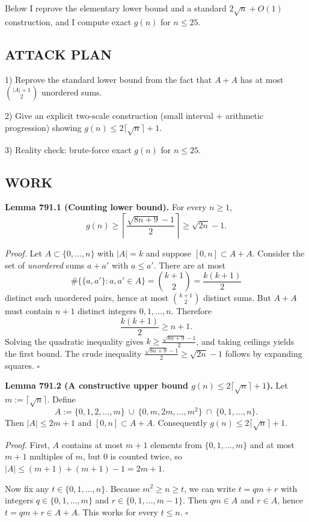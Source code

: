 Below I reprove the elementary lower bound and a standard $2\sqrt n+O(1)$ construction, and I compute exact $g(n)$ for $n\le 25$.

\subsection*{ATTACK PLAN}
1) Reprove the standard lower bound from the fact that $A+A$ has at most $\binom{|A|+1}{2}$ unordered sums.

2) Give an explicit two-scale construction (small interval + arithmetic progression) showing $g(n)\le 2\lceil\sqrt n\rceil+1$.

3) Reality check: brute-force exact $g(n)$ for $n\le 25$.

\subsection*{WORK}
\textbf{Lemma 791.1 (Counting lower bound).}
For every $n\ge 1$,
\[
 g(n)\ge \left\lceil\frac{\sqrt{8n+9}-1}{2}\right\rceil \ge \sqrt{2n}-1.
\]

\emph{Proof.}
Let $A\subset\{0,\dots,n\}$ with $|A|=k$ and suppose $[0,n]\subset A+A$.
Consider the set of \emph{unordered} sums $a+a'$ with $a\le a'$.
There are at most
\[
\#\{\{a,a'\}: a,a'\in A\} = \binom{k+1}{2} = \frac{k(k+1)}{2}
\]
distinct such unordered pairs, hence at most $\binom{k+1}{2}$ distinct sums.
But $A+A$ must contain $n+1$ distinct integers $0,1,\dots,n$.
Therefore
\[
\frac{k(k+1)}{2} \ge n+1.
\]
Solving the quadratic inequality gives
$k\ge \frac{\sqrt{8n+9}-1}{2}$, and taking ceilings yields the first bound.
The crude inequality $\frac{\sqrt{8n+9}-1}{2}\ge \sqrt{2n}-1$ follows by expanding squares. \hfill$\square$

\medskip
\textbf{Lemma 791.2 (A constructive upper bound $g(n)\le 2\lceil\sqrt n\rceil+1$).}
Let $m:=\lceil \sqrt n\rceil$. Define
\[
A := \{0,1,2,\dots,m\}\ \cup\ \{0,m,2m,\dots,m^2\}\ \cap\ \{0,1,\dots,n\}.
\]
Then $|A|\le 2m+1$ and $[0,n]\subset A+A$. Consequently $g(n)\le 2\lceil\sqrt n\rceil+1$.

\emph{Proof.}
First, $A$ contains at most $m+1$ elements from $\{0,1,\dots,m\}$ and at most $m+1$ multiples of $m$, but $0$ is counted twice, so $|A|\le (m+1)+(m+1)-1=2m+1$.

Now fix any $t\in\{0,1,\dots,n\}$. Because $m^2\ge n\ge t$, we can write
$t=qm+r$ with integers $q\in\{0,1,\dots,m\}$ and $r\in\{0,1,\dots,m-1\}$.
Then $qm\in A$ and $r\in A$, hence $t=qm+r\in A+A$. This works for every $t\le n$.
\hfill$\square$

